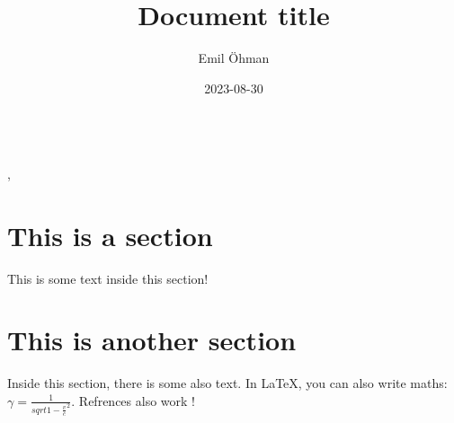 \documentclass[a4paper]{article}
\title{Document title}
\author{Emil Öhman}
\date{2023-08-30}
\begin{document}
\makeatletter
\huge{\textbf{\@title}}\vspace{0.33em}\\
\Large{\@author, \@date}\normalsize
\makeatother

\tableofcontents

\section{This is a section}
This is some text inside this section!

\section{This is another section}
Inside this section, there is some also text. In \LaTeX, you can also write maths: \(\gamma=\frac{1}{sqrt{1-{\frac{v}{c}}^2}}\). Refrences also work \cite{lee2023roomtemperature}!

\printbibliography
\end{document}
